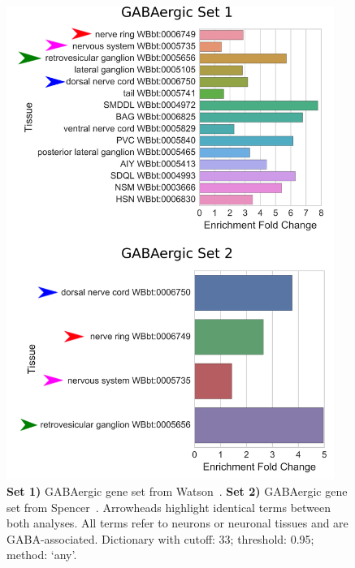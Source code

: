 \documentclass{bmcart}
\begin{document}
\begin{backmatter}
\begin{figure}
  \includegraphics[width=0.95\textwidth]{GABAcomparison3.pdf}
  \captionsetup{width= 0.95\textwidth}
  \caption{
  \textbf{Set 1)} GABAergic gene set from Watson~\cite{Watson2008a}.
  \textbf{Set 2)} GABAergic gene set from Spencer~\cite{Spencer2011}.
  Arrowheads highlight identical terms between both analyses. All terms refer to neurons or neuronal tissues and are GABA-associated. Dictionary with cutoff: 33; threshold: 0.95; method: `any'.
   }
  \label{fig:intragree}
\end{figure}



\end{backmatter}
\end{document}
